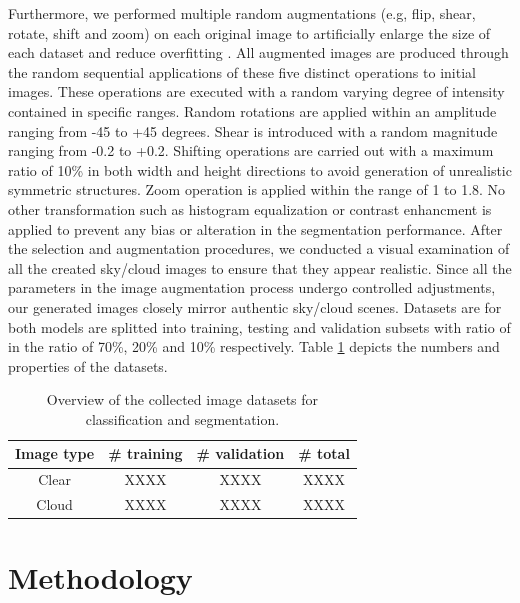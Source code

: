 \documentclass[amt, article]{copernicus}
\begin{document}
Furthermore, we performed multiple random augmentations (e.g, flip, shear, rotate, shift and zoom) on each original image to artificially enlarge the size of each dataset and reduce overfitting \citep{perez2017effectiveness, 8388338, yang2022image}.
All augmented images are produced through the random sequential applications of these five distinct operations to initial images.
These operations are executed with a random varying degree of intensity contained in specific ranges. Random rotations are applied within an amplitude ranging from -45 to +45 degrees. Shear is introduced with a random magnitude ranging from -0.2 to +0.2. Shifting operations are carried out with a maximum ratio of 10\% in both width and height directions to avoid generation of unrealistic symmetric structures. Zoom operation is applied within the range of 1 to 1.8. No other transformation such as histogram equalization or contrast enhancment is applied to prevent any bias or alteration in the segmentation performance. After the selection and augmentation procedures, we conducted a visual examination of all the created sky/cloud images to ensure that they appear realistic. Since all the parameters in the image augmentation process undergo controlled adjustments, our generated images closely mirror authentic sky/cloud scenes.
Datasets are for both models are splitted into training, testing and validation subsets with ratio of in the ratio of 70\%, 20\% and 10\% respectively. Table \ref{tab:dataset} depicts the numbers and properties of the datasets. 

\begin{table}[t]
\begin{center}
    \caption{Overview of the collected image datasets for classification and segmentation.}
    \begin{tabular}{c c c c} 
        \tophline
     Image type & \# training & \# validation & \# total \\ [1.0ex]
     \hline
     Clear & XXXX & XXXX & XXXX \\ [1.0ex]
     \hline
     Cloud & XXXX & XXXX & XXXX \\ [1.0ex]
     \hline
    \end{tabular}
    \belowtable{}
    \label{tab:dataset}
    \end{center}
    

\end{table}

\section{Methodology}
\label{sec:framework}
\end{document}
